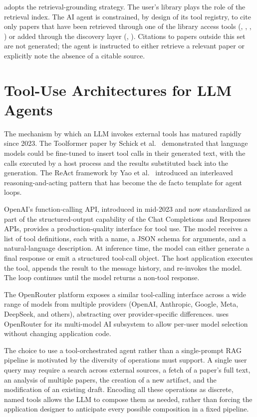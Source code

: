 \sh{} adopts the retrieval-grounding strategy. The user's library plays the role of the retrieval index. The AI agent is constrained, by design of its tool registry, to cite only papers that have been retrieved through one of the library access tools (, , , ) or added through the discovery layer (, ). Citations to papers outside this set are not generated; the agent is instructed to either retrieve a relevant paper or explicitly note the absence of a citable source.

\section{Tool-Use Architectures for LLM Agents}
\label{sec:lit-toolagent}

The mechanism by which an LLM invokes external tools has matured rapidly since 2023. The Toolformer paper by Schick et al.\ \cite{schick2023toolformer} demonstrated that language models could be fine-tuned to insert tool calls in their generated text, with the calls executed by a host process and the results substituted back into the generation. The ReAct framework by Yao et al.\ \cite{yao2023react} introduced an interleaved reasoning-and-acting pattern that has become the de facto template for agent loops.

OpenAI's function-calling API, introduced in mid-2023 and now standardized as part of the structured-output capability of the Chat Completions and Responses APIs, provides a production-quality interface for tool use. The model receives a list of tool definitions, each with a name, a JSON schema for arguments, and a natural-language description. At inference time, the model can either generate a final response or emit a structured tool-call object. The host application executes the tool, appends the result to the message history, and re-invokes the model. The loop continues until the model returns a non-tool response.

The OpenRouter platform exposes a similar tool-calling interface across a wide range of models from multiple providers (OpenAI, Anthropic, Google, Meta, DeepSeek, and others), abstracting over provider-specific differences. \sh{} uses OpenRouter for its multi-model AI subsystem to allow per-user model selection without changing application code.

The choice to use a tool-orchestrated agent rather than a single-prompt RAG pipeline is motivated by the diversity of operations \sh{} must support. A single user query may require a search across external sources, a fetch of a paper's full text, an analysis of multiple papers, the creation of a new artifact, and the modification of an existing draft. Encoding all these operations as discrete, named tools allows the LLM to compose them as needed, rather than forcing the application designer to anticipate every possible composition in a fixed pipeline.

